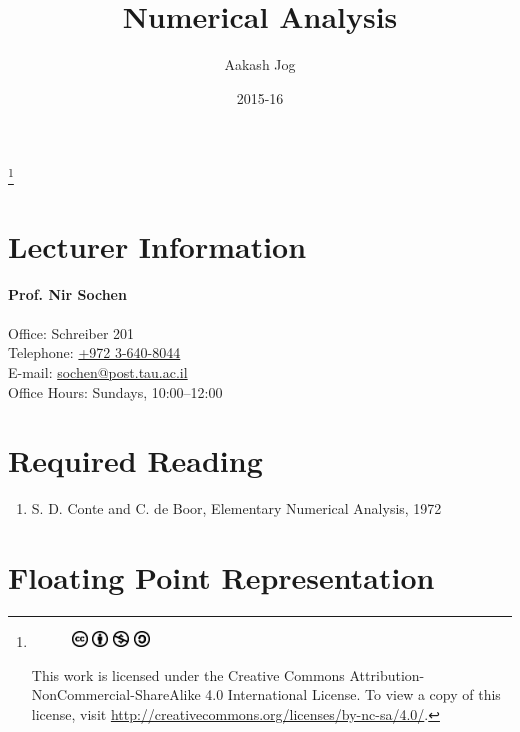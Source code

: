 \documentclass[fleqn, a4paper, 12pt, twoside]{article}
\title{Numerical Analysis}
\author{Aakash Jog}
\date{2015-16}
\theoremstyle{definition}
\theoremstyle{theorem}
\newcommand\blfootnote[1]{%
	\begingroup
	\renewcommand\thefootnote{}\footnote{#1}%
	\addtocounter{footnote}{-1}%
	\endgroup
}
\begin{document}
\maketitle

\blfootnote
{	
	\begin{figure}[H]
		\includegraphics[height = 12pt]{cc.eps}
		\includegraphics[height = 12pt]{by.eps}
		\includegraphics[height = 12pt]{nc.eps}
		\includegraphics[height = 12pt]{sa.eps}
	\end{figure}
	This work is licensed under the Creative Commons Attribution-NonCommercial-ShareAlike 4.0 International License. To view a copy of this license, visit \url{http://creativecommons.org/licenses/by-nc-sa/4.0/}.
} %

\tableofcontents

\newpage
\section{Lecturer Information}

\textbf{Prof. Nir Sochen}\\
~\\
Office: Schreiber 201\\
Telephone: \href{tel:+972 3-640-8044}{+972 3-640-8044}\\
E-mail: \href{mailto:sochen@post.tau.ac.il}{sochen@post.tau.ac.il}\\
Office Hours: Sundays, 10:00--12:00

\section{Required Reading}

\begin{enumerate}
	\item S. D. Conte and C. de Boor, Elementary Numerical Analysis, 1972
\end{enumerate}

\newpage

\section{Floating Point Representation}
\end{document}
